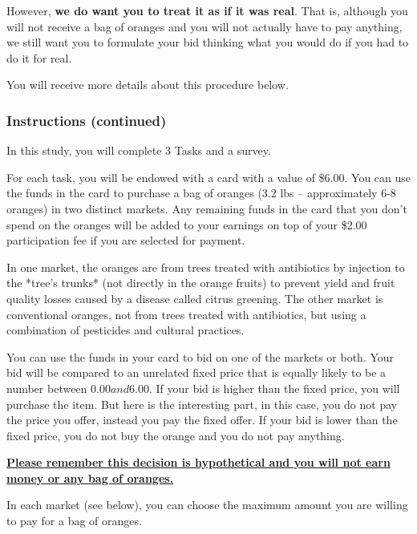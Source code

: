 \documentclass[12pt]{article}
\begin{document}
However,\textbf{ we do want you to treat it as if it was real}. That is, although you will not receive a bag of oranges and you will not actually have to pay anything, we still want you to formulate your bid thinking what you would do if you had to do it for real. \par

You will receive more details about this procedure below.

\clearpage



\subsubsection*{Instructions (continued)}

In this study, you will complete 3 Tasks and a survey.

For each task, you will be endowed with a card with a value of \$6.00. You can use the funds in the card to purchase a bag of oranges (3.2 lbs – approximately 6-8 oranges) in two distinct markets. Any remaining funds in the card that you don’t spend on the oranges will be added to your earnings on top of your \$2.00 participation fee if you are selected for payment.



In one market, the oranges are from trees treated with antibiotics by injection to the *tree’s trunks* (not directly in the orange fruits) to prevent yield and fruit quality losses caused by a disease called citrus greening. The other market is conventional oranges, not from trees treated with antibiotics, but using a combination of pesticides and cultural practices.

You can use the funds in your card to bid on one of the markets or both. Your bid will be compared to an unrelated fixed price that is equally likely to be a number between $0.00 and $6.00. If your bid is higher than the fixed price, you will purchase the item. But here is the interesting part, in this case, you do not pay the price you offer, instead you pay the fixed offer. If your bid is lower than the fixed price, you do not buy the orange and you do not pay anything. 

\vspace{0.5cm}

{\textbf{\uline{Please remember this decision is hypothetical
and you will not earn money  or any bag of oranges.}}}



In each market (see below), you can choose the maximum amount you are willing to pay for a bag of oranges.
\clearpage
\end{document}
